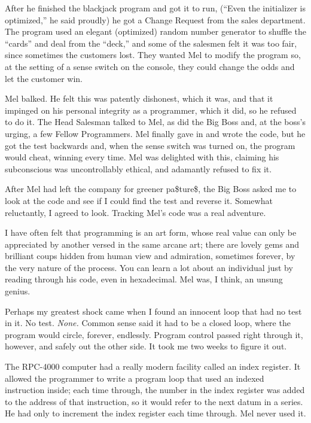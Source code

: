 \documentclass[12pt]{article}
\begin{document}
\bigskip
After he finished the blackjack program and got it to run,
(``Even the initializer is optimized,'' he said proudly) he
got a Change Request from the sales department. The program
used an elegant (optimized) random number generator to
shuffle the ``cards'' and deal from the ``deck,'' and some of
the salesmen felt it was too fair, since sometimes the
customers lost. They wanted Mel to modify the program so,
at the setting of a sense switch on the console, they could
change the odds and let the customer win.

\bigskip
Mel balked. He felt this was patently dishonest, which it
was, and that it impinged on his personal integrity as a
programmer, which it did, so he refused to do it. The Head
Salesman talked to Mel, as did the Big Boss and, at the
boss's urging, a few Fellow Programmers. Mel finally gave
in and wrote the code, but he got the test backwards and,
when the sense switch was turned on, the program would
cheat, winning every time. Mel was delighted with this,
claiming his subconscious was uncontrollably ethical, and
adamantly refused to fix it.

\bigskip
After Mel had left the company for greener pa\$ture\$, the Big
Boss asked me to look at the code and see if I could find
the test and reverse it. Somewhat reluctantly, I agreed to
look. Tracking Mel's code was a real adventure.

\bigskip
I have often felt that programming is an art form, whose
real value can only be appreciated by another versed in the
same arcane art; there are lovely gems and brilliant coups
hidden from human view and admiration, sometimes forever, by
the very nature of the process. You can learn a lot about
an individual just by reading through his code, even in
hexadecimal. Mel was, I think, an unsung genius.

\bigskip
Perhaps my greatest shock came when I found an innocent loop
that had no test in it. No test. {\it None.} Common sense said
it had to be a closed loop, where the program would circle,
forever, endlessly. Program control passed right through
it, however, and safely out the other side. It took me two
weeks to figure it out.

\bigskip
The RPC-4000 computer had a really modern facility called an
index register. It allowed the programmer to write a
program loop that used an indexed instruction inside; each
time through, the number in the index register was added to
the address of that instruction, so it would refer to the
next datum in a series. He had only to increment the index
register each time through. Mel never used it.
\end{document}
